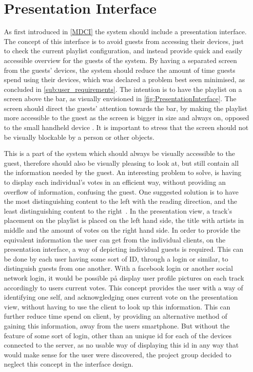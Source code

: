 \section{Presentation Interface}
As first introduced in \cref{MDCI} the system should include a presentation interface. The concept of this interface is to avoid guests from accessing their devices, just to check the current playlist configuration, and instead provide quick and easily accessible overview for the guests of the system. By having a separated screen from the guests' devices, the system should reduce the amount of time guests spend using their devices, which was declared a problem best seen minimised, as concluded in \cref{sub:user_requirements}. The intention is to have the playlist on a screen above the bar, as visually envisioned in \cref{fig:PresentationInterface}. The screen should direct the guests' attention towards the bar, by making the playlist more accessible to the guest as the screen is bigger in size and always on, opposed to the small handheld device \cite{DEB}. It is important to stress that the screen should not be visually blockable by a person or other objects.

This is a part of the system which should always be visually accessible to the guest, therefore should also be visually pleasing to look at, but still contain all the information needed by the guest. An interesting problem to solve, is having to display each individual's votes in an efficient way, without providing an overflow of information, confusing the guest. One suggested solution is to have the most distinguishing content to the left with the reading direction, and the least distinguishing content to the right~\cite{material}. In the presentation view, a track's placement on the playlist is placed on the left hand side, the title with artists in middle and the amount of votes on the right hand side. In order to provide the equivalent information the user can get from the individual clients, on the presentation interface, a way of depicting individual guests is required. This can be done by each user having some sort of ID, through a login or similar, to distinguish guests from one another. With a facebook login or another social network login, it would be possible på display user profile pictures on each track accordingly to users current votes. This concept provides the user with a way of identifying one self, and acknowgledging ones current vote on the presentation view, without having to use the client to look up this information. This can further reduce time spend on client, by providing an alternative method of gaining this information, away from the users smartphone. But without the feature of some sort of login, other than an unique id for each of the devices connected to the server, as no usable way of displaying this id in any way that would make sense for the user were discovered, the project group decided to neglect this concept in the interface design.

